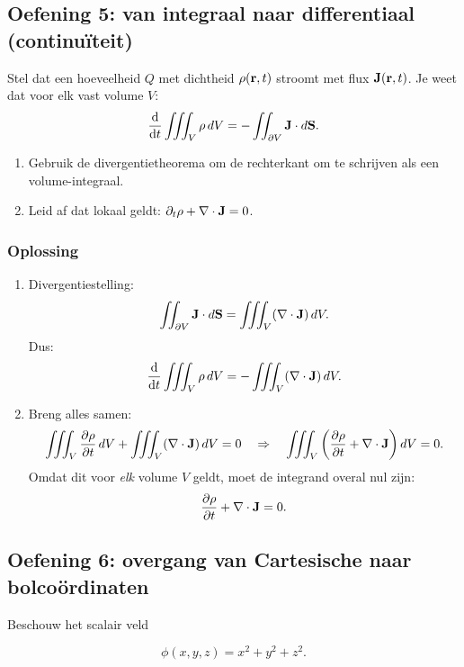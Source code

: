 \documentclass[11pt,a4paper]{article}
\begin{document}

    \subsection{Oefening 5: van integraal naar differentiaal (continu\"iteit)}
    Stel dat een hoeveelheid \(Q\) met dichtheid \(\rho(\vb{r},t)\) stroomt met flux \(\vb{J}(\vb{r},t)\).
    Je weet dat voor elk vast volume \(V\):
    \[
        \dv{}{t}\iiint_V \rho\, dV = - \iint_{\partial V} \vb{J}\cdot d\vb{S}.
    \]
    \begin{enumerate}
        \item Gebruik de divergentietheorema om de rechterkant om te schrijven als een volume-integraal.
        \item Leid af dat lokaal geldt: \(\partial_t\rho + \nabla\cdot\vb{J}=0\).
    \end{enumerate}

    \subsubsection*{Oplossing}
    \begin{enumerate}
        \item Divergentiestelling:
        \[
            \iint_{\partial V}\vb{J}\cdot d\vb{S} = \iiint_V (\nabla\cdot\vb{J})\, dV.
        \]
        Dus:
        \[
            \dv{}{t}\iiint_V \rho\, dV = -\iiint_V (\nabla\cdot\vb{J})\, dV.
        \]
        \item Breng alles samen:
        \[
            \iiint_V \pdv{\rho}{t}\, dV + \iiint_V (\nabla\cdot\vb{J})\, dV = 0
            \quad\Rightarrow\quad
            \iiint_V \left(\pdv{\rho}{t} + \nabla\cdot\vb{J}\right)dV = 0.
        \]
        Omdat dit voor \emph{elk} volume \(V\) geldt, moet de integrand overal nul zijn:
        \[
            \pdv{\rho}{t} + \nabla\cdot\vb{J}=0.
        \]
    \end{enumerate}


    \subsection{Oefening 6: overgang van Cartesische naar bolcoördinaten}

    Beschouw het scalair veld

    \[
        \phi(x,y,z) = x^2 + y^2 + z^2.
    \]
\end{document}
